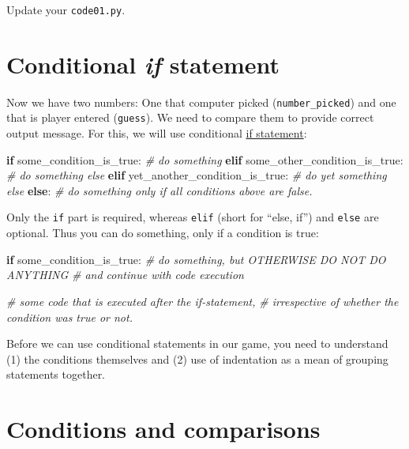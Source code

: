 \documentclass[
]{book}
\newenvironment{Shaded}{\begin{snugshade}}{\end{snugshade}}
\newcommand{\CommentTok}[1]{\textcolor[rgb]{0.56,0.35,0.01}{\textit{#1}}}
\newcommand{\ControlFlowTok}[1]{\textcolor[rgb]{0.13,0.29,0.53}{\textbf{#1}}}
\newcommand{\NormalTok}[1]{#1}
\begin{document}
Update your \texttt{code01.py}.

\hypertarget{if-statement}{%
\section{\texorpdfstring{Conditional \emph{if} statement}{Conditional if statement}}\label{if-statement}}

Now we have two numbers: One that computer picked (\texttt{number\_picked}) and one that is player entered (\texttt{guess}). We need to compare them to provide correct output message. For this, we will use conditional \href{https://docs.python.org/3/tutorial/controlflow.html\#if-statements}{if statement}:

\begin{Shaded}
\begin{Highlighting}[]
\ControlFlowTok{if}\NormalTok{ some\_condition\_is\_true:}
    \CommentTok{\# do something}
\ControlFlowTok{elif}\NormalTok{ some\_other\_condition\_is\_true:}
    \CommentTok{\# do something else}
\ControlFlowTok{elif}\NormalTok{ yet\_another\_condition\_is\_true:}
    \CommentTok{\# do yet something else}
\ControlFlowTok{else}\NormalTok{:}
    \CommentTok{\# do something only if all conditions above are false.}
\end{Highlighting}
\end{Shaded}

Only the \texttt{if} part is required, whereas \texttt{elif} (short for ``else, if'') and \texttt{else} are optional. Thus you can do something, only if a condition is true:

\begin{Shaded}
\begin{Highlighting}[]
\ControlFlowTok{if}\NormalTok{ some\_condition\_is\_true:}
    \CommentTok{\# do something, but OTHERWISE DO NOT DO ANYTHING }
    \CommentTok{\# and continue with code execution}
  
\CommentTok{\# some code that is executed after the if{-}statement,}
\CommentTok{\# irrespective of whether the condition was true or not.}
\end{Highlighting}
\end{Shaded}

Before we can use conditional statements in our game, you need to understand (1) the conditions themselves and (2) use of indentation as a mean of grouping statements together.

\hypertarget{comparisons}{%
\section{Conditions and comparisons}\label{comparisons}}
\end{document}
